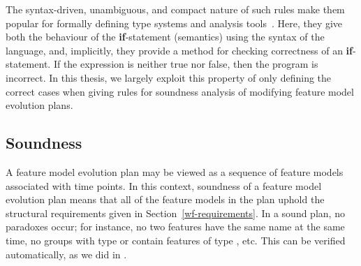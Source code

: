 The syntax-driven, unambiguous, and compact nature of such rules make them popular for formally defining type systems and analysis tools~\cite{book:principles-of-program-analysis}. Here, they give both the behaviour of the \textbf{if}-statement (semantics) using the syntax of the language, and, implicitly, they provide a method for checking correctness of an \textbf{if}-statement. If the expression is neither true nor false, then the program is incorrect. In this thesis, we largely exploit this property of only defining the correct cases when giving rules for soundness analysis of modifying feature model evolution plans.



\subsection{Soundness}
A feature model evolution plan may be viewed as a sequence of feature models associated with time points. 
In this context, soundness of a feature model evolution plan means that all of the feature models in the plan uphold the structural requirements  given in Section~\vref{wf-requirements}. In a sound plan, no paradoxes occur; for instance, no two features have the same name at the same time, no groups with type \xortype{} or \ortype{} contain features of type \mandatory{}, etc. This can be verified automatically, as we did in \cite{art:consistency-preserving-evolution-planning}.
